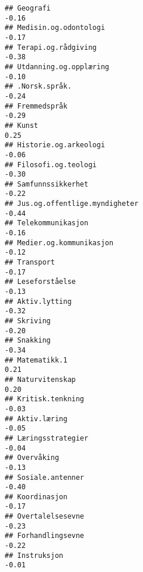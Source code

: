 \documentclass[
]{article}
\begin{document}
\begin{verbatim}
## Geografi                                                                         -0.16
## Medisin.og.odontologi                                                            -0.17
## Terapi.og.rådgiving                                                              -0.38
## Utdanning.og.opplæring                                                           -0.10
## .Norsk.språk.                                                                    -0.24
## Fremmedspråk                                                                     -0.29
## Kunst                                                                             0.25
## Historie.og.arkeologi                                                            -0.06
## Filosofi.og.teologi                                                              -0.30
## Samfunnssikkerhet                                                                -0.22
## Jus.og.offentlige.myndigheter                                                    -0.44
## Telekommunikasjon                                                                -0.16
## Medier.og.kommunikasjon                                                          -0.12
## Transport                                                                        -0.17
## Leseforståelse                                                                   -0.13
## Aktiv.lytting                                                                    -0.32
## Skriving                                                                         -0.20
## Snakking                                                                         -0.34
## Matematikk.1                                                                      0.21
## Naturvitenskap                                                                    0.20
## Kritisk.tenkning                                                                 -0.03
## Aktiv.læring                                                                     -0.05
## Læringsstrategier                                                                -0.04
## Overvåking                                                                       -0.13
## Sosiale.antenner                                                                 -0.40
## Koordinasjon                                                                     -0.17
## Overtalelsesevne                                                                 -0.23
## Forhandlingsevne                                                                 -0.22
## Instruksjon                                                                      -0.01

\end{verbatim}
\end{document}

